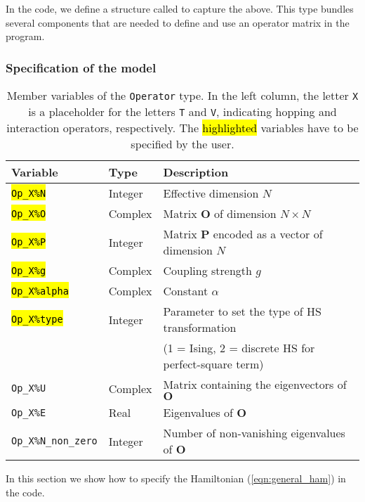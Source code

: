 \documentclass{SciPost}
\DeclareRobustCommand{\hlgray}[1]{{\sethlcolor{dark-gray}\hl{#1}}}
\begin{document}
In the code, we define a structure called  to capture the above. 
This type  bundles several components that are needed to define and use an operator matrix in the program.  
%
\subsubsection{Specification of the model}\label{sec:specific}
%
\begin{table}[h]
    \begin{tabular}{@{} l l l @{}}\toprule
    Variable & Type & Description \\\midrule
    \hlgray{\texttt{Op\_X\%N}}       & Integer     &  Effective dimension $N$ \\
    \hlgray{\texttt{Op\_X\%O}}       & Complex    &  Matrix  $\mathbf{O}$  of dimension $N \times N$\\
    \hlgray{\texttt{Op\_X\%P}}       & Integer   &  Matrix $\mathbf{P}$  encoded as a vector of dimension $N$\\
    \hlgray{\texttt{Op\_X\%g}}       & Complex    &  Coupling strength $g$ \\  
    \hlgray{\texttt{Op\_X\%alpha}}   & Complex  &  Constant $\alpha$ \\
    \hlgray{\texttt{Op\_X\%type}}    & Integer   &  Parameter to set the type of 
                                             HS transformation\\
                             &   &  (1 = Ising, 2 = discrete HS for perfect-square term)  \\ 
    \texttt{Op\_X\%U}            & Complex &  Matrix containing the eigenvectors of $\mathbf{O}$  \\
    \texttt{Op\_X\%E}            & Real &  Eigenvalues of $\mathbf{O}$ \\
    \texttt{Op\_X\%N\_non\_zero} & Integer &  Number of non-vanishing eigenvalues of $\mathbf{O}$ \\\bottomrule
   \end{tabular}
   \caption{Member variables of the \texttt{Operator}  type. 
   In the left column, the letter \texttt{X} is a placeholder for the letters \texttt{T} and \texttt{V}, 
   indicating hopping and interaction operators, respectively.
   The \hlgray{highlighted} variables have to be specified by the user.
    \label{table:operator}}
\end{table}
%
In this section we show how to specify the  Hamiltonian (\ref{eqn:general_ham}) in the code. 
\end{document}
